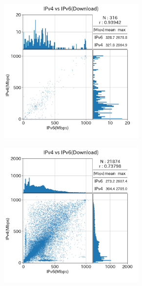 \begin{figure}[htbp]
\begin{center}
\begin{minipage}[t]{0.48\textwidth}
\begin{subfigure}[b]{\textwidth}
                \label{old_mix_dl}
            \end{subfigure}
            \begin{subfigure}[b]{\textwidth}
                \centering
                \includegraphics[width=0.8\textwidth]{fig/old_PPPoE_dl.png}
                \label{old_PPPoE_dl}
            \end{subfigure}
        \caption{(1)のダウンロードのスループット}
        \label{fig:old_connect_dl}
        \end{minipage}
        \hfill
        \begin{minipage}[t]{0.48\textwidth}
            \begin{subfigure}[b]{\textwidth}
                \centering
                \includegraphics[width=0.8\textwidth]{fig/new_IPv4aaS_dl.png}

\end{subfigure}
\end{minipage}
\end{center}
\end{figure}
